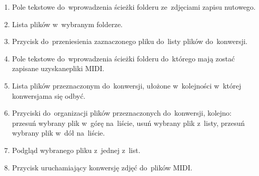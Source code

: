 \begin{enumerate}
	\item Pole tekstowe do~wprowadzenia ścieżki folderu ze~zdjęciami zapisu nutowego.
	\item Lista plików w~wybranym folderze.
	\item Przycisk do~przeniesienia zaznaczonego pliku do~listy plików do~konwersji.
	\item Pole tekstowe do~wprowadzenia ścieżki folderu do~którego mają zostać zapisane uzyskane\linebreak pliki MIDI.
	\item Lista plików przeznaczonym do~konwersji, ułożone w~kolejności w~której konwersja\linebreak ma się odbyć.
	\item Przyciski do~organizacji plików przeznaczonych do~konwersji, kolejno: przesuń wybrany plik w~górę na~liście, usuń wybrany plik z~listy, przesuń wybrany plik w~dół na~liście.
	\item Podgląd wybranego pliku z~jednej z~list.
	\item Przycisk uruchamiający konwersję zdjęć do~plików MIDI.
\end{enumerate}